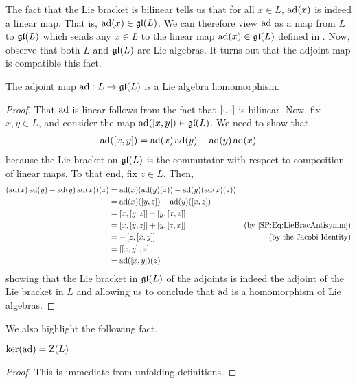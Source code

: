 The fact that the Lie bracket is bilinear tells us that for all $x \in L$, $\operatorname{ad}\!\left( x \right)$ is indeed a linear map. That is, $\operatorname{ad}\!\left( x \right) \in \mathfrak{gl}\!\left( L \right)$. We can therefore view $\operatorname{ad}$ as a map from $L$ to $\mathfrak{gl}\!\left( L \right)$ which sends any $x \in L$ to the linear map $\operatorname{ad}\!\left( x \right) \in \mathfrak{gl}\!\left( L \right)$ defined in . Now, observe that both $L$ and $\mathfrak{gl}\!\left( L \right)$ are Lie algebras. It turns out that the adjoint map is compatible this fact.

\begin{boxproposition}\label{Ch1:Prop:AdjointLieAlgHom}
    The adjoint map $\operatorname{ad} : L \to \mathfrak{gl}\!\left( L \right)$ is a Lie algebra homomorphism.
\end{boxproposition}
\begin{proof}
    That $\operatorname{ad}$ is linear follows from the fact that $\left[ \cdot, \cdot \right]$ is bilinear. Now, fix $x, y \in L$, and consider the map $\operatorname{ad}\!\left( \left[ x, y \right] \right) \in \mathfrak{gl}\!\left( L \right)$. We need to show that
    \begin{align*}
        \operatorname{ad}\!\left( \left[ x, y \right] \right) = \operatorname{ad}\!\left( x \right)\operatorname{ad}\!\left( y \right) - \operatorname{ad}\!\left( y \right)\operatorname{ad}\!\left( x \right)
    \end{align*}
    because the Lie bracket on $\mathfrak{gl}\!\left( L \right)$ is the commutator with respect to composition of linear maps. To that end, fix $z \in L$. Then,
    \begin{align*}
        \parenth{\pad{x}\pad{y} - \pad{y}\pad{x}}\!(z)
        &= \pad{x}\!\parenth{\pad{y}\!(z)} - \pad{y}\!\parenth{\pad{x}\!(z)} & \\
        &= \pad{x}\!\parenth{\brac{y, z}} - \pad{y}\!\parenth{\brac{x, z}} & \\
        &= \brac{x, \brac{y, z}} - \brac{y, \brac{x, z}} & \\
        &= \brac{x, \brac{y, z}} + \brac{y, \brac{z, x}} & \text{(by \eqref{SP:Eq:LieBracAntisymm})} \\
        &= - \brac{z, \brac{x, y}} & \text{(by the Jacobi Identity)} \\
        &= \brac{\brac{x, y}, z} \\
        &= \pad{\brac{x, y}}\!(z)
    \end{align*}
    showing that the Lie bracket in $\mathfrak{gl}\!\left( L \right)$ of the adjoints is indeed the adjoint of the Lie bracket in $L$ and allowing us to conclude that $\operatorname{ad}$ is a homomorphism of Lie algebras.
\end{proof}

We also highlight the following fact.
\begin{boxlemma}
    $\operatorname{ker}\!\left( \operatorname{ad} \right) = \operatorname{Z}\!\left( L \right)$
\end{boxlemma}
\begin{proof}
    This is immediate from unfolding definitions.
\end{proof}

